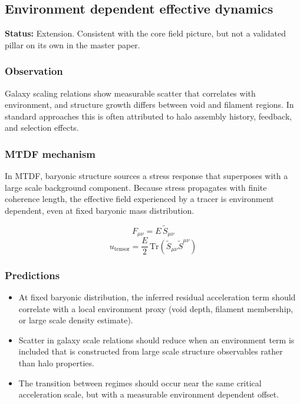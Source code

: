 \documentclass[11pt,a4paper]{article}
\begin{document}
\subsection{Environment dependent effective dynamics}
\begin{mdframed}[linecolor=accent,linewidth=0.5pt,backgroundcolor=callout-bg,leftline=true,rightline=true,topline=true,bottomline=true,innerleftmargin=8pt,innerrightmargin=8pt,innertopmargin=6pt,innerbottommargin=6pt]
\textbf{Status:} Extension. Consistent with the core field picture, but not a validated pillar on its own in the master paper.
\end{mdframed}

\subsubsection{Observation}
Galaxy scaling relations show measurable scatter that correlates with environment, and structure growth differs between void and filament regions. In standard approaches this is often attributed to halo assembly history, feedback, and selection effects.

\subsubsection{MTDF mechanism}
In MTDF, baryonic structure sources a stress response that superposes with a large scale background component. Because stress propagates with finite coherence length, the effective field experienced by a tracer is environment dependent, even at fixed baryonic mass distribution.

$$
F_{\mu\nu} = E\,\tilde{S}_{\mu\nu}
$$
$$
u_{\mathrm{tensor}} = \frac{E}{2}\,\mathrm{Tr}\!\left(\tilde{S}_{\mu\nu}\tilde{S}^{\mu\nu}\right)
$$

\subsubsection{Predictions}
\begin{itemize}
  \item At fixed baryonic distribution, the inferred residual acceleration term should correlate with a local environment proxy (void depth, filament membership, or large scale density estimate).
  \item Scatter in galaxy scale relations should reduce when an environment term is included that is constructed from large scale structure observables rather than halo properties.
  \item The transition between regimes should occur near the same critical acceleration scale, but with a measurable environment dependent offset.
\end{itemize}
\end{document}
